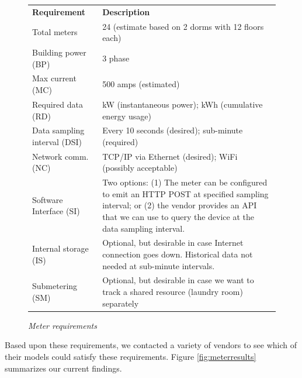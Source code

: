 \documentclass[11pt]{article}
\begin{document}
\begin{figure}[!ht]
\small
\begin{tabular}{p{1.75in}p{4.25in}} \hline
{\bf Requirement} & {\bf Description}  \\
Total meters & 24 (estimate based on 2 dorms with 12 floors each) \\ 

Building power (BP) & 3 phase \\  

Max current (MC) & 500 amps (estimated)  \\ 

Required data (RD) & kW (instantaneous power); kWh (cumulative energy usage) \\ 

Data sampling interval (DSI) & Every 10 seconds (desired); sub-minute (required) \\ 

Network comm. (NC) & TCP/IP via Ethernet (desired); WiFi (possibly acceptable) \\ 

Software Interface (SI) & Two options: (1) The meter can be configured to emit
an HTTP POST at specified sampling interval; or (2) the vendor provides an
API that we can use to query the device at the data sampling interval. \\ 

Internal storage (IS) & Optional, but desirable in case Internet connection
goes down. Historical data not needed at sub-minute intervals. \\ 

Submetering (SM) & Optional, but desirable in case we want to track a shared
resource (laundry room) separately \\ \hline

\end{tabular} 
\normalsize
\caption{{\em Meter requirements}}
\label{fig:meterrequirements}
\end{figure}

Based upon these requirements, we contacted a variety of vendors to see
which of their models could satisfy these requirements.  Figure
\ref{fig:meterresults} summarizes our current findings.  
\end{document}

